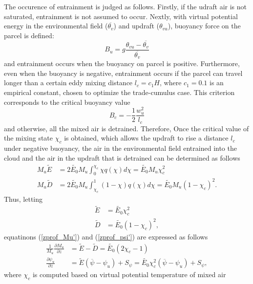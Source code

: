 \documentclass[platex, dvipdfmx]{article}
\begin{document}
The occurence of entrainment is judged as follows. Firstly, if the udraft air is not saturated, entrainment is not assumed to occur.
Nextly, with virtual potential energy in the environmental field ($\overline{\theta_v}$) and updraft ($\theta_{vu}$), buoyancy force on the parcel is defined:
\begin{equation}\label{buoy_u}
    B_u = g\frac{\theta_{vu} - \overline{\theta_{v}}}{ \overline{\theta_v}}
\end{equation}
and entrainment occurs when the buoyancy on parcel is positive.
Furthermore, even when the buoyancy is negative, entrainment occurs if the parcel can travel longer than a certain eddy mixing distance $l_c=c_1 H$, where $c_1=0.1$ is an empirical constant, 
chosen to optimize the trade-cumulus case. This criterion corresponds to the critical buoyancy value
\begin{equation}\label{buoy_c}
    B_c = -\frac{1}{2}\frac{w_u^2}{l_c}    
\end{equation}
and otherwise, all the mixed air is detrained.
Therefore, Once the critical value of the mixing state $\chi_c$ is obtained, which allows the updraft to rise a distance $l_c$ under negative buoyancy, 
the air in the environmental field entrained into the cloud and the air in the updraft that is detrained can be determined as follows
\begin{align}
    M_u\tilde{E}&=2\tilde{E_0} M_u\int_0^{\chi_c}\chi q(\chi) d\chi = \tilde{E_0} M_u \chi_c^2 \label{flux_entre}\\
    M_u\tilde{D}&=2\tilde{E_0} M_u\int_{\chi_c}^{1}(1-\chi) q(\chi) d\chi = \tilde{E_0} M_u (1-\chi_c)^2. \label{flux_detre}
\end{align}
Thus, letting
\begin{align}
    \tilde{E}&=\tilde{E_0}\chi_c^2 \label{Etilde}\\
    \tilde{D}&=\tilde{E_0}(1-\chi_c)^2, \label{Dtilde}
\end{align}
equatinons (\ref{zprof_Mu'}) and (\ref{zprof_psi'}) are expressed as follows
\begin{align}
    \frac{1}{M_u}\frac{\partial M_u}{\partial z} &= \tilde{E} - \tilde{D} = \tilde{E_0}(2\chi_c - 1) \label{zprof_Mu_param}\\
    \frac{\partial \psi_u}{\partial z} &= \tilde{E} (\overline{\psi}-\psi_u) + S_{\psi} = \tilde{E_0}\chi_c^2(\overline{\psi}-\psi_u) + S_{\psi}, \label{zprof_psi_param}
\end{align}
where $\chi_c$ is computed based on virtual potential temperature of mixed air
\end{document}
